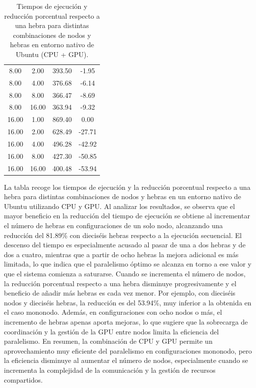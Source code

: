 \begin{table}[ht]
\begin{tabular}{|c|c|c|c|}
        8.00           & 2.00            & 393.50              & -1.95                          \\
        8.00           & 4.00            & 376.68              & -6.14                          \\
        8.00           & 8.00            & 366.47              & -8.69                          \\
        8.00           & 16.00           & 363.94              & -9.32                          \\
        16.00          & 1.00            & 869.40              & 0.00                           \\
        16.00          & 2.00            & 628.49              & -27.71                         \\
        16.00          & 4.00            & 496.28              & -42.92                         \\
        16.00          & 8.00            & 427.30              & -50.85                         \\
        16.00          & 16.00           & 400.48              & -53.94                         \\
        \hline
    \end{tabular}
    \caption{Tiempos de ejecución y reducción porcentual respecto a una hebra para distintas combinaciones de nodos y hebras en entorno nativo de Ubuntu (CPU + GPU).}
    \label{tab:thread_sweep_ubuntu_gpu_native}
\end{table}

La tabla recoge los tiempos de ejecución y la reducción porcentual respecto a una hebra para distintas combinaciones de nodos y hebras en un entorno nativo de Ubuntu utilizando CPU y GPU. Al analizar los resultados, se observa que el mayor beneficio en la reducción del tiempo de ejecución se obtiene al incrementar el número de hebras en configuraciones de un solo nodo, alcanzando una reducción del 81.89\% con dieciséis hebras respecto a la ejecución secuencial. El descenso del tiempo es especialmente acusado al pasar de una a dos hebras y de dos a cuatro, mientras que a partir de ocho hebras la mejora adicional es más limitada, lo que indica que el paralelismo óptimo se alcanza en torno a ese valor y que el sistema comienza a saturarse. Cuando se incrementa el número de nodos, la reducción porcentual respecto a una hebra disminuye progresivamente y el beneficio de añadir más hebras es cada vez menor. Por ejemplo, con dieciséis nodos y dieciséis hebras, la reducción es del 53.94\%, muy inferior a la obtenida en el caso mononodo. Además, en configuraciones con ocho nodos o más, el incremento de hebras apenas aporta mejoras, lo que sugiere que la sobrecarga de coordinación y la gestión de la GPU entre nodos limita la eficiencia del paralelismo. En resumen, la combinación de CPU y GPU permite un aprovechamiento muy eficiente del paralelismo en configuraciones mononodo, pero la eficiencia disminuye al aumentar el número de nodos, especialmente cuando se incrementa la complejidad de la comunicación y la gestión de recursos compartidos.

